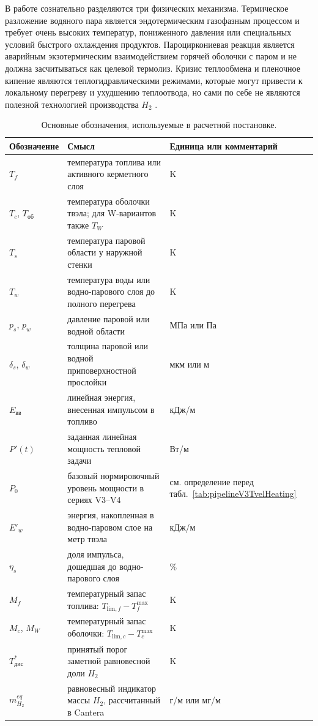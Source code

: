\documentclass[12pt]{article}
\begin{document}
В работе сознательно разделяются три физических механизма. Термическое разложение водяного пара является эндотермическим газофазным процессом и требует очень высоких температур, пониженного давления или специальных условий быстрого охлаждения продуктов. Пароциркониевая реакция является аварийным экзотермическим взаимодействием горячей оболочки с паром и не должна засчитываться как целевой термолиз. Кризис теплообмена и пленочное кипение являются теплогидравлическими режимами, которые могут привести к локальному перегреву и ухудшению теплоотвода, но сами по себе не являются полезной технологией производства \(H_2\) \cite{IAEATECDOC1578,TsutsumiWaterSplitting,LOCAOxidation}.

\begin{table}[H]
    \centering
    \small
    \caption{Основные обозначения, используемые в расчетной постановке.}
    \label{tab:notation}
    \begin{tabularx}{\textwidth}{@{}p{}p{}X@{}}
        \toprule
        Обозначение & Смысл & Единица или комментарий\\
        \midrule
        \(T_f\) & температура топлива или активного керметного слоя & K\\
        \(T_c\), \(T_{\mathrm{об}}\) & температура оболочки твэла; для W-вариантов также \(T_W\) & K\\
        \(T_s\) & температура паровой области у наружной стенки & K\\
        \(T_w\) & температура воды или водно-парового слоя до полного перегрева & K\\
        \(p_s\), \(p_w\) & давление паровой или водной области & МПа или Па\\
        \(\delta_s\), \(\delta_w\) & толщина паровой или водной приповерхностной прослойки & мкм или м\\
        \(E_{\mathrm{вв}}\) & линейная энергия, внесенная импульсом в топливо & кДж/м\\
        \(P'(t)\) & заданная линейная мощность тепловой задачи & Вт/м\\
        \(P_0\) & базовый нормировочный уровень мощности в сериях V3--V4 & см. определение перед табл.~\ref{tab:pipelineV3TvelHeating}\\
        \(E'_w\) & энергия, накопленная в водно-паровом слое на метр твэла & кДж/м\\
        \(\eta_s\) & доля импульса, дошедшая до водно-парового слоя & \%\\
        \(M_f\) & температурный запас топлива: \(T_{\mathrm{lim},f}-T_f^{\max}\) & K\\
        \(M_c\), \(M_W\) & температурный запас оболочки: \(T_{\mathrm{lim},c}-T_c^{\max}\) & K\\
        \(T^*_{\mathrm{дис}}\) & принятый порог заметной равновесной доли \(H_2\) & K\\
        \(m_{H_2}^{eq}\) & равновесный индикатор массы \(H_2\), рассчитанный в Cantera & г/м или мг/м\\
        \bottomrule
    \end{tabularx}
\end{table}
\end{document}
